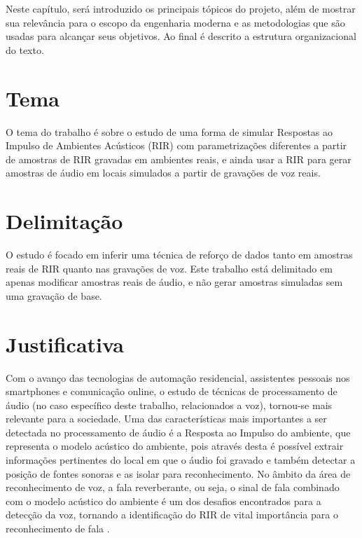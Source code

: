 Neste capítulo, será introduzido os principais tópicos do projeto, além de mostrar sua relevância para o escopo da engenharia moderna
e as metodologias que são usadas para alcançar seus objetivos. Ao final é descrito a estrutura organizacional do texto.

\section{Tema}

O tema do trabalho é sobre o estudo de uma forma de simular Respostas ao Impulso de Ambientes Acústicos (RIR) com parametrizações diferentes a partir de amostras 
de RIR gravadas em ambientes reais, e ainda usar a RIR para gerar amostras de áudio em locais simulados a partir de gravações de voz reais.

\section{Delimitação}

O estudo é focado em inferir uma técnica de reforço de dados tanto em amostras reais de RIR quanto nas gravações de voz. Este trabalho está delimitado em apenas 
modificar amostras reais de áudio, e não gerar amostras simuladas sem uma gravação de base.


\section{Justificativa}

Com o avanço das tecnologias de automação residencial, assistentes pessoais nos smartphones e comunicação online, o estudo de técnicas de
processamento de áudio (no caso específico deste trabalho, relacionados a voz), tornou-se mais relevante para a sociedade.
Uma das características mais importantes a ser detectada no processamento de áudio é a Resposta ao Impulso do ambiente, 
que representa o modelo acústico do ambiente, pois através desta é possível extrair informações pertinentes do local em que o áudio foi gravado
e também detectar a posição de fontes sonoras e as isolar para reconhecimento.
No âmbito da área de reconhecimento de voz, a fala reverberante, ou seja, o sinal de fala combinado com o modelo acústico do ambiente
é um dos desafios encontrados para a detecção da voz, tornando a identificação do RIR de vital importância para o reconhecimento de fala \cite{FAR-FIELD_ASR}.

